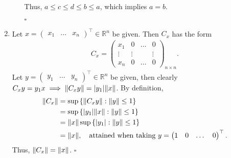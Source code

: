 \documentclass[11pt]{article}
\begin{document}
\begin{enumerate}
\begin{itemize}
		Thus, $a \leq c \leq d \leq b \leq a$, which implies $a = b$.
		
		\hfill $\square$
	\end{itemize}
	
	
	\item Let ${x} = \begin{pmatrix}
	x_1 & \dots & x_n
	\end{pmatrix}^\top \in \mathbb{R}^n$ be given. Then $C_x$ has the form
	\begin{align*}
	C_x = \begin{pmatrix}
	x_1 & 0 & \dots & 0\\
	\vdots & \vdots &  & \vdots\\
	x_n & 0 & \dots & 0
	\end{pmatrix}_{n\times n}.
	\end{align*} 
	Let ${y} = \begin{pmatrix}
	y_1 & \dots & y_n
	\end{pmatrix}^\top \in \mathbb{R}^n$ be given, then clearly $C_x {y} = y_1 {x} \implies \norm{ C_xy } = | y_1 | \norm{ x}$. By definition, 
	\begin{align*}
	\norm{ C_x } &= \sup \left\{\norm{ C_x y } : \norm{ y } \leq 1\right\}\nonumber\\
	&= \sup \left\{|y_1| \norm{x} :\norm{y} \leq 1\right\}\nonumber\\
	&= \norm{x}\sup \left\{|y_1|:\norm{y} \leq 1\right\}\nonumber\\
	&= \norm{x}, \quad \text{attained when taking } y = \begin{pmatrix}
	1 & 0 & \dots & 0
	\end{pmatrix}^\top.
	\end{align*}
	Thus, $\norm{C_x} = \norm{x}$. 
	\hfill $\square$
	

	
	
	
	

\end{enumerate}
\end{document}
